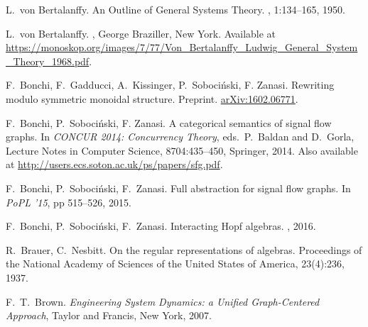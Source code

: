 \begin{thebibliography}{RSW00}

    L.\ von Bertalanffy. 
    \newblock An Outline of General Systems Theory.
    , 1:134--165,
    1950.
    
    L.\ von Bertalanffy. 
    ,
    George Braziller, New York.
    \newblock Available at
    \href{https://monoskop.org/images/7/77/Von_Bertalanffy_Ludwig_General_System_Theory_1968.pdf}{https://monoskop.org/images/7/77/Von\_Bertalanffy\_Ludwig\_General\_System\_Theory\_1968.pdf}.

    F.\ Bonchi, F.\ Gadducci, A.\ Kissinger, P.\ Soboci\'nski, F. Zanasi.
    \newblock Rewriting modulo symmetric monoidal structure.
    \newblock Preprint.
    \newblock \href{http://arxiv.org/abs/1602.06771}{arXiv:1602.06771}.

    F.\ Bonchi, P.\ Soboci\'nski, F. Zanasi.
    \newblock A categorical semantics of signal flow graphs.
    \newblock In \emph{CONCUR 2014: Concurrency Theory}, eds.\ P.\ Baldan and
    D.\ Gorla, Lecture Notes in Computer Science, 8704:435--450, Springer, 2014.
    \newblock Also available at
    \href{http://users.ecs.soton.ac.uk/ps/papers/sfg.pdf}
    {http://users.ecs.soton.ac.uk/ps/papers/sfg.pdf}.
    
    F.\ Bonchi, P.\ Soboci\'nski, F.\ Zanasi.
    \newblock Full abstraction for signal flow graphs.
    \newblock In \emph{PoPL '15}, pp 515--526, 2015.

    F.\ Bonchi, P.\ Soboci\'nski, F.\ Zanasi.
    \newblock Interacting Hopf algebras.
    , 2016.


    R.\ Brauer, C.\ Nesbitt. 
    \newblock On the regular representations of algebras.
    \newblock Proceedings of the National Academy of Sciences of the United
    States of America, 23(4):236, 1937.

    F.\ T.\ Brown.
    \newblock \textsl{Engineering System Dynamics: a 
    Unified Graph-Centered Approach}, Taylor and Francis, New York, 2007. 


\end{thebibliography}
